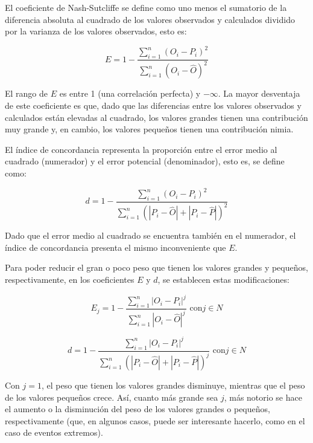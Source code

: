 \documentclass[12pt]{article}
\begin{document}
El coeficiente de Nash-Sutcliffe se define como uno menos el sumatorio de la diferencia absoluta al cuadrado de los valores observados y calculados dividido por la varianza de los valores observados, esto es:

\begin{equation}
E = 1 - \frac{\sum^{n}_{i=1}(O_{i} - P_{i})^2}{\sum^{n}_{i=1}(O_{i} - \hat{O})^2}
\label{eq:nash_sutcliffe}
\end{equation}

El rango de $E$ es entre 1 (una correlación perfecta) y $-\infty$. La mayor desventaja de este coeficiente es que, dado que las diferencias entre los valores observados y calculados están elevadas al cuadrado, los valores grandes tienen una contribución muy grande y, en cambio, los valores pequeños tienen una contribución nimia.

El índice de concordancia representa la proporción entre el error medio al cuadrado (numerador) y el error potencial (denominador), esto es, se define como:

\begin{equation}
d = 1 - \frac{\sum^{n}_{i=1}(O_{i} - P_{i})^2}{\sum^{n}_{i=1}(|P_{i} - \hat{O}| + |P_{i} - \hat{P}|)^2}
\label{eq:indice_concordancia}
\end{equation}

Dado que el error medio al cuadrado se encuentra también en el numerador, el índice de concordancia presenta el mismo inconveniente que $E$.

Para poder reducir el gran o poco peso que tienen los valores grandes y pequeños, respectivamente, en los coeficientes $E$ y $d$, se establecen estas modificaciones:

\begin{equation}
E_{j} = 1 - \frac{\sum^{n}_{i=1}|O_{i} - P_{i}|^j}{\sum^{n}_{i=1}|O_{i} - \hat{O}|^j} \text{ con} j \in N
\label{eq:nash_sutcliffe_mod}
\end{equation}

\begin{equation}
d = 1 - \frac{\sum^{n}_{i=1}|O_{i} - P_{i}|^j}{\sum^{n}_{i=1}(|P_{i} - \hat{O}| + |P_{i} - \hat{P}|)^j} \text{ con} j \in N
\label{eq:indice_concordancia_mod}
\end{equation}

Con $j = 1$, el peso que tienen los valores grandes disminuye, mientras que el peso de los valores pequeños crece. Así, cuanto más grande sea $j$, más notorio se hace el aumento o la disminución del peso de los valores grandes o pequeños, respectivamente (que, en algunos casos, puede ser interesante hacerlo, como en el caso de eventos extremos).
\end{document}

